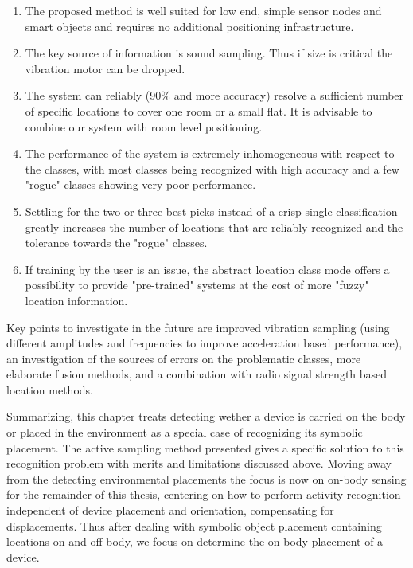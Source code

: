 \begin{enumerate}
\item The proposed method is well suited for low end, simple sensor
 nodes and smart objects and requires no additional positioning infrastructure. 
\item The key source of information is sound sampling. Thus if
size is critical the vibration motor can be dropped.
\item The system can reliably (90\% and more accuracy) resolve a 
sufficient number of specific locations to cover one room or a small flat. It is advisable to combine our system with room level positioning.
\item The performance of the system is extremely inhomogeneous with respect to
the classes, with most classes being recognized with high accuracy and a
few "rogue" classes showing very poor performance.
\item Settling for the two or three best picks instead of a crisp single
 classification greatly increases the number of locations that are
 reliably recognized and the tolerance towards the "rogue" classes. 
\item If training by the user is an issue, the abstract location class
 mode offers a possibility to provide "pre-trained" systems at the
 cost of more "fuzzy" location information. \end{enumerate}

Key points to investigate in the future are improved vibration
sampling (using different amplitudes and frequencies to improve
acceleration based performance), an investigation of the sources of
errors on the problematic classes, more elaborate fusion methods, and
a combination with radio signal strength based location methods. 

Summarizing, this chapter treats detecting wether a device is carried on
the body or placed in the environment as a special case of recognizing
its symbolic placement. The active sampling method presented gives a
specific solution to this recognition problem with merits and
limitations discussed above. Moving away from the detecting
environmental placements the focus is now on on-body sensing for the
remainder of this thesis, centering on how to perform activity
recognition independent of device placement and orientation,
compensating for displacements. Thus after dealing with symbolic
object placement containing locations on and off body, we focus on
determine the on-body placement of a device.





